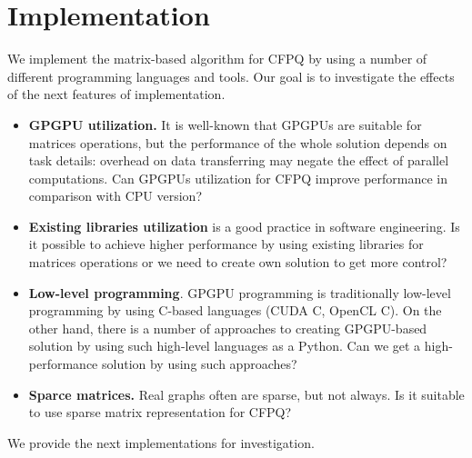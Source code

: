 \section{Implementation}

We implement the matrix-based algorithm for CFPQ by using a number of different programming languages and tools.
Our goal is to investigate the effects of the next features of implementation.
\begin{itemize}
\item \textbf{GPGPU utilization.}
It is well-known that GPGPUs are suitable for matrices operations, but the performance of the whole solution depends on task details: overhead on data transferring may negate the effect of parallel computations.
Can GPGPUs utilization for CFPQ improve performance in comparison with CPU version?

\item \textbf{Existing libraries utilization} is a good practice in software engineering.
Is it possible to achieve higher performance by using existing libraries for matrices operations or we need to create own solution to get more control?

\item \textbf{Low-level programming}.
GPGPU programming is traditionally low-level programming by using C-based languages (CUDA C, OpenCL C).
On the other hand, there is a number of approaches to creating GPGPU-based solution by using such high-level languages as a Python.
Can we get a high-performance solution by using such approaches?

\item \textbf{Sparce matrices.} Real graphs often are sparse, but not always.
Is it suitable to use sparse matrix representation for CFPQ?

\end{itemize}

We provide the next implementations for investigation.

